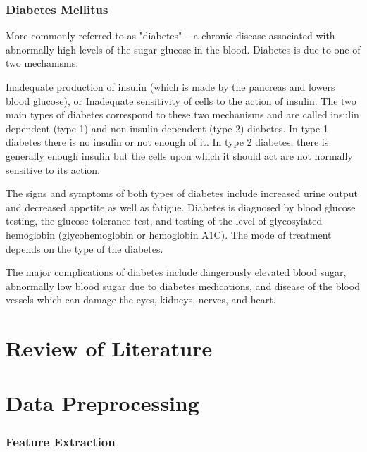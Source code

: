 \documentclass[12pt]{article}
\begin{document}
\newpage
\section{Diabetes Mellitus}
More commonly referred to as "diabetes" -- a chronic disease associated with abnormally high levels of the sugar glucose in the blood. Diabetes is due to one of two mechanisms:

Inadequate production of insulin (which is made by the pancreas and lowers blood glucose), or
Inadequate sensitivity of cells to the action of insulin.
The two main types of diabetes correspond to these two mechanisms and are called insulin dependent (type 1) and non-insulin dependent (type 2) diabetes. In type 1 diabetes there is no insulin or not enough of it. In type 2 diabetes, there is generally enough insulin but the cells upon which it should act are not normally sensitive to its action.

The signs and symptoms of both types of diabetes include increased urine output and decreased appetite as well as fatigue. Diabetes is diagnosed by blood glucose testing, the glucose tolerance test, and testing of the level of glycosylated hemoglobin (glycohemoglobin or hemoglobin A1C). The mode of treatment depends on the type of the diabetes.

The major complications of diabetes include dangerously elevated blood sugar, abnormally low blood sugar due to diabetes medications, and disease of the blood vessels which can damage the eyes, kidneys, nerves, and heart.

\newpage
\part{Review of Literature}
\iffalse
Source : https://www.ncbi.nlm.nih.gov/pmc/articles/PMC5851210/
\fi

\iffalse
PDF :
Andreas Holzinger 1,2( B )

Holzinger Group, HCI-KDD, Institute for Medical Informatics,
Statistics and Documentation, Medical University Graz, Graz, Austria
a.holzinger@hci-kdd.org

Institute for Information Systems and Computer Media,
Graz University of Technology, Graz, Austria
\fi



\newpage
\part{Data Preprocessing}
\section{Feature Extraction}
\end{document}
